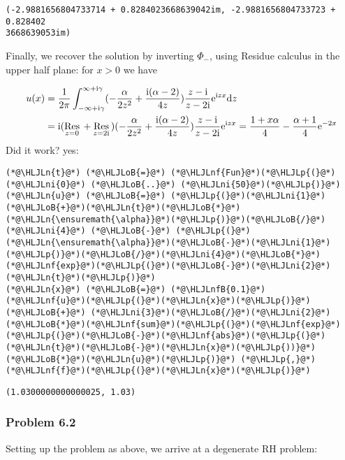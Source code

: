 \documentclass[12pt,a4paper]{article}
\newcommand{\HLJLn}[1]{#1}
\newcommand{\HLJLnf}[1]{\textcolor[RGB]{66,102,213}{#1}}
\newcommand{\HLJLnfB}[1]{\textcolor[RGB]{59,151,46}{#1}}
\newcommand{\HLJLni}[1]{\textcolor[RGB]{59,151,46}{#1}}
\newcommand{\HLJLoB}[1]{\textcolor[RGB]{102,102,102}{\textbf{#1}}}
\newcommand{\HLJLp}[1]{#1}
\def\D{ {\rm d} }
\def\I{ {\rm i} }
\def\E{ {\rm e} }
\def\Res_#1{\underset{#1}{\rm Res}\,}
\def\dz{\D z}
\begin{document}
\begin{lstlisting}
(-2.9881656804733714 + 0.8284023668639042im, -2.9881656804733723 + 0.828402
3668639053im)
\end{lstlisting}


Finally, we recover the solution by inverting $\Phi_-$, using Residue calculus in the upper half plane: for $x > 0$ we have


\begin{align*}
u(x) &= {1 \over 2 \pi} \int_{-\infty+ \I \gamma}^{\infty + \I \gamma} (-{\alpha \over 2 z^2}+{\I (\alpha-2) \over 4 z}  ) {z - \I  \over z - 2\I}  \E^{\I z x}  \dz \\
&= \I (\Res_{z = 0} + \Res_{z = 2\I}) (-{\alpha \over 2 z^2}+{\I (\alpha-2) \over 4 z}  ) {z - \I  \over z - 2\I}  \E^{\I z x} = {1+x \alpha \over 4} - {\alpha+1 \over 4} \E^{-2 x}
\end{align*}
Did it work? yes:


\begin{lstlisting}
(*@\HLJLn{t}@*) (*@\HLJLoB{=}@*) (*@\HLJLnf{Fun}@*)(*@\HLJLp{(}@*)(*@\HLJLni{0}@*) (*@\HLJLoB{..}@*) (*@\HLJLni{50}@*)(*@\HLJLp{)}@*)
(*@\HLJLn{u}@*) (*@\HLJLoB{=}@*) (*@\HLJLp{(}@*)(*@\HLJLni{1}@*)(*@\HLJLoB{+}@*)(*@\HLJLn{t}@*)(*@\HLJLoB{*}@*)(*@\HLJLn{\ensuremath{\alpha}}@*)(*@\HLJLp{)}@*)(*@\HLJLoB{/}@*)(*@\HLJLni{4}@*) (*@\HLJLoB{-}@*) (*@\HLJLp{(}@*)(*@\HLJLn{\ensuremath{\alpha}}@*)(*@\HLJLoB{-}@*)(*@\HLJLni{1}@*)(*@\HLJLp{)}@*)(*@\HLJLoB{/}@*)(*@\HLJLni{4}@*)(*@\HLJLoB{*}@*)(*@\HLJLnf{exp}@*)(*@\HLJLp{(}@*)(*@\HLJLoB{-}@*)(*@\HLJLni{2}@*)(*@\HLJLn{t}@*)(*@\HLJLp{)}@*)
(*@\HLJLn{x}@*) (*@\HLJLoB{=}@*) (*@\HLJLnfB{0.1}@*)
(*@\HLJLnf{u}@*)(*@\HLJLp{(}@*)(*@\HLJLn{x}@*)(*@\HLJLp{)}@*) (*@\HLJLoB{+}@*) (*@\HLJLni{3}@*)(*@\HLJLoB{/}@*)(*@\HLJLni{2}@*)(*@\HLJLoB{*}@*)(*@\HLJLnf{sum}@*)(*@\HLJLp{(}@*)(*@\HLJLnf{exp}@*)(*@\HLJLp{(}@*)(*@\HLJLoB{-}@*)(*@\HLJLnf{abs}@*)(*@\HLJLp{(}@*)(*@\HLJLn{t}@*)(*@\HLJLoB{-}@*)(*@\HLJLn{x}@*)(*@\HLJLp{))}@*)(*@\HLJLoB{*}@*)(*@\HLJLn{u}@*)(*@\HLJLp{)}@*) (*@\HLJLp{,}@*) (*@\HLJLnf{f}@*)(*@\HLJLp{(}@*)(*@\HLJLn{x}@*)(*@\HLJLp{)}@*)
\end{lstlisting}

\begin{lstlisting}
(1.0300000000000025, 1.03)
\end{lstlisting}


\subsubsection{Problem 6.2}
Setting up the problem as above, we arrive at a degenerate RH problem:
\end{document}
